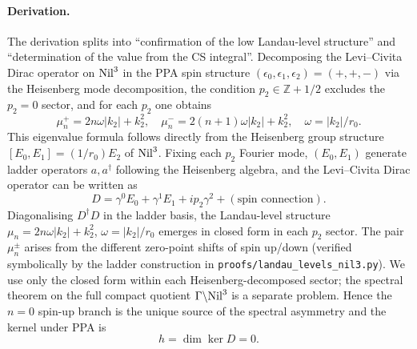 \paragraph{Derivation.}
The derivation splits into ``confirmation of the low Landau-level
structure'' and ``determination of the value from the CS integral''.
Decomposing the Levi--Civita Dirac operator on $\mathrm{Nil}^3$ in the PPA spin
structure $(\epsilon_0, \epsilon_1, \epsilon_2) = (+,+,-)$ via the
Heisenberg mode decomposition, the condition $p_2\in\mathbb{Z}+1/2$
excludes the $p_2 = 0$ sector, and for each $p_2$ one obtains
\begin{equation}
  \mu_n^+ = 2 n\omega|k_2| + k_2^2,
  \quad
  \mu_n^- = 2(n+1)\omega|k_2| + k_2^2,
  \quad
  \omega = |k_2|/r_0.
\end{equation}
This eigenvalue formula follows directly from the Heisenberg group
structure $[E_0, E_1] = (1/r_0) E_2$ of $\mathrm{Nil}^3$.  Fixing each $p_2$
Fourier mode, $(E_0, E_1)$ generate ladder operators $a, a^\dagger$
following the Heisenberg algebra, and the Levi--Civita Dirac operator can
be written as
\begin{equation}
  D = \gamma^0 E_0 + \gamma^1 E_1 + i p_2\gamma^2 + (\text{spin connection}).
\end{equation}
Diagonalising $D^\dagger D$ in the ladder basis, the Landau-level structure
$\mu_n = 2n\omega|k_2| + k_2^2$, $\omega = |k_2|/r_0$ emerges in closed form
in each $p_2$ sector.  The pair $\mu_n^\pm$ arises from the different
zero-point shifts of spin up/down (verified symbolically by the
ladder construction in
\texttt{proofs/landau\_levels\_nil3.py}).  We use only the closed form within
each Heisenberg-decomposed sector; the spectral theorem on the full compact
quotient $\Gamma\backslash\mathrm{Nil}^3$ is a separate problem.  Hence the
$n=0$ spin-up branch is the unique source of the spectral asymmetry and
the kernel under PPA is
\begin{equation}
  h = \dim\ker D = 0.
\end{equation}

